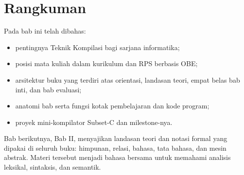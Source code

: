 \section*{Rangkuman}

Pada bab ini telah dibahas:
\begin{itemize}[leftmargin=*]
  \item pentingnya Teknik Kompilasi bagi sarjana informatika;
  \item posisi mata kuliah dalam kurikulum dan RPS berbasis OBE;
  \item arsitektur buku yang terdiri atas orientasi, landasan teori,
        empat belas bab inti, dan bab evaluasi;
  \item anatomi bab serta fungsi kotak pembelajaran dan kode program;
  \item proyek mini-kompilator Subset-C dan milestone-nya.
\end{itemize}

Bab berikutnya, Bab II, menyajikan landasan teori dan notasi formal
yang dipakai di seluruh buku: himpunan, relasi, bahasa, tata bahasa,
dan mesin abstrak. Materi tersebut menjadi bahasa bersama untuk
memahami analisis leksikal, sintaksis, dan semantik.
